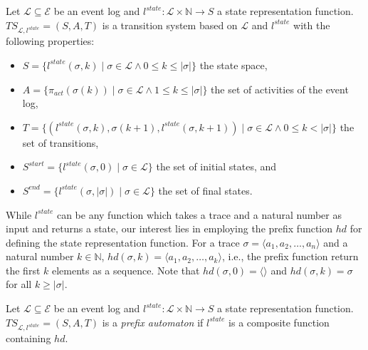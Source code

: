 \begin{definition}\label{def:pa}

    Let $\mathcal{L} \subseteq \mathcal{E}$ be an event log and $l^{state} \colon \mathcal{L} \times \mathbb{N} \rightarrow S$ a state representation function. $\mathit{TS}_{\mathcal{L}, l^{state}} = (S, A, T)$ is a transition system based on $\mathcal{L}$ and $l^{state}$ with the following properties:
    
    \begin{itemize}
        \item $S = \{l^{state}(\sigma, k) \mid \sigma \in \mathcal{L} \land 0 \leq k \leq \lvert \sigma \rvert \}$ the state space,
        \item $A = \{ \pi_{act}(\sigma(k)) \mid \sigma \in \mathcal{L} \land 1 \leq k \leq \lvert \sigma \rvert \}$ the set of activities of the event log,
        \item $T = \{ (l^{state}(\sigma, k), \sigma(k+1), l^{state}(\sigma, k+1)) \mid \sigma \in \mathcal{L} \land 0 \leq k < \lvert \sigma \rvert \}$ the set of transitions,
        \item $S^{start} = \{ l^{state}(\sigma, 0) \mid \sigma \in \mathcal{L} \}$ the set of initial states, and
        \item $S^{end} = \{ l^{state}(\sigma, \lvert \sigma \rvert) \mid \sigma \in \mathcal{L} \}$ the set of final states.
    \end{itemize} 
\end{definition}

While $l^{state}$ can be any function which takes a trace and a natural number as input and returns a state, our interest lies in employing the prefix function $\mathit{hd}$ for defining the state representation function. For a trace $\sigma = \langle a_1, a_2, \dots, a_n \rangle$ and a natural number $k \in \mathbb{N}$, $\mathit{hd}(\sigma, k) = \langle a_1, a_2, \dots, a_k \rangle$, i.e., the prefix function return the first $k$ elements as a sequence. Note that $\mathit{hd}(\sigma, 0) = \langle \rangle$ and $\mathit{hd}(\sigma, k) = \sigma$ for all $k \geq \lvert \sigma \rvert$.

\begin{definition}
    Let $\mathcal{L} \subseteq \mathcal{E}$ be an event log and $l^{state} \colon \mathcal{L} \times \mathbb{N} \rightarrow S$ a state representation function. $\mathit{TS}_{\mathcal{L}, l^{state}} = (S, A, T)$ is a \emph{prefix automaton} if $l^{state}$ is a composite function containing $\mathit{hd}$.
\end{definition}

